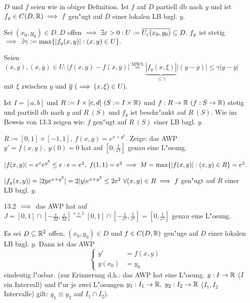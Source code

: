 \documentclass{article}
\begin{document}
\begin{satz}
$D$ und $f$ seien wie in obiger Definition. Ist $f$ auf $D$ partiell db nach $y$ und ist $f_y\in C(D,\mathbb{R}) \implies f$ gen"ugt auf $D$ einer lokalen LB bzgl. $y$.
\end{satz}

\begin{beweis}
Sei $(x_0,y_0) \in D.\ D$ offen $\implies \exists \varepsilon>0: U:=\overline{U_\varepsilon(x_0,y_0)}\subseteq D.\ f_y$ ist stetig $\implies \exists \gamma:=\max\{|f_y(x,y)|:(x,y)\in U\}.$

Seien $(x,y),(x,\overline{y})\in U: |f(x,y)-f(x,\overline{y})| \overset{\text{MWS}}{=} \underbrace{|f_y(x,\xi)|}_{\le \gamma}|(y-\overline{y})| \le \gamma |y-\overline{y}|$ mit $\xi$ zwischen $y$ und $\overline{y}\ (\implies (x,\xi)\in U).$
\end{beweis}

\begin{bemerkung}
Ist $I=[a,b]$ und $R:=I\times[c,d]\ (S:=I\times\mathbb{R})$ und $f:R\to\mathbb{R}\ (f:S\to\mathbb{R})$ stetig und partiell db nach $y$ auf $R\ (S)$ und $f_y$ ist beschr"ankt auf $R\ (S)$. Wie im Beweis von 13.3 zeigen wir: $f$ gen"ugt auf $R\ (S)$ einer LB bzgl. $y$.
\end{bemerkung}

\begin{beispiel}
$R:=[0,1]\times[-1,1],\ f(x,y)=e^{x+y^2}.$ Zeige: das AWP $y'=f(x,y),\ y(0)=0$ hat auf $[0,\frac{1}{e^2}]$ genau eine L"osung.
\end{beispiel}

\begin{beweis}
$|f(x,y)| = e^xe^{y^2} \le e\cdot e=e^2,\ f(1,1) = e^2 \folgt M=\max\{|f(x,y)|:(x,y)\in R\} = e^2.$

$|f_y(x,y)| = |2y e^{x+y^2}| = 2|y|e^{x+y^2}\le 2 e^2\ \forall (x,y)\in R \implies f$ gen"ugt auf $R$ einer LB bzgl. $y$.

13.2 $\implies$ das AWP hat auf $J=[0,1]\cap[-\frac{s}{M},\frac{s}{M}] \overset{s=1}{=} [0,1]\cap[-\frac{1}{e^2},\frac{1}{e^2}] = [0,\frac{1}{e^2}]$ genau eine L"osung.
\end{beweis}

\begin{satz}
Es sei $D\subseteq\mathbb{R}^2$ offen, $(x_0,y_0)\in D$ und $f\in C(D,\mathbb{R})$ gen"uge auf $D$ einer lokalen LB bzgl. $y$. Dann ist das AWP
$$\begin{cases}
y'    &=f(x,y)\\
y(x_0)&=y_0
\end{cases}$$
eindeutig l"osbar. (zur Erinnerung d.h.: das AWP hat eine L"osung. $y:I\to\mathbb{R}$ ($I$ ein Intervall) und f"ur je zwei L"osungen $y_1:I_1\to\mathbb{R},\ y_2:I_2\to\mathbb{R}$ ($I_1,I_2$ Intervalle) gilt: $y_1 \equiv y_2$ auf $I_1\cap I_2$).
\end{satz}
\end{document}
